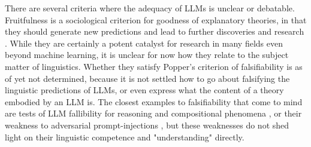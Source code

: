 There are several criteria where the adequacy of LLMs is unclear or debatable. Fruitfulness is a sociological criterion for goodness of explanatory theories, in that they should generate new predictions and lead to further discoveries and research \citep{}. While they are certainly a potent catalyst for research in many fields even beyond machine learning, it is unclear for now how they relate to the subject matter of linguistics. Whether they satisfy Popper's criterion of falsifiability is as of yet not determined, because it is not settled how to go about falsifying the linguistic predictions of LLMs, or even express what the content of a theory embodied by an LLM is. The closest examples to falsifiability that come to mind are tests of LLM fallibility for reasoning and compositional phenomena \citep{}, or their weakness to adversarial prompt-injections \citep{}, but these weaknesses do not shed light on their linguistic competence and "understanding" directly.\\


